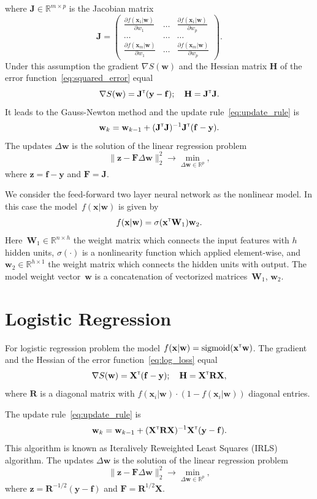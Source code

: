 \documentclass[a4paper,12pt]{article}
\theoremstyle{plain} %
\theoremstyle{definition} %
\theoremstyle{remark} %
\newcommand{\bw}{\mathbf{w}}
\newcommand{\by}{\mathbf{y}}
\newcommand{\bx}{\mathbf{x}}
\newcommand{\bz}{\mathbf{z}}
\newcommand{\bJ}{\mathbf{J}}
\newcommand{\bbR}{\mathbb{R}}
\newcommand{\bW}{\mathbf{W}}
\newcommand{\bH}{\mathbf{H}}
\newcommand{\bF}{\mathbf{F}}
\newcommand{\bR}{\mathbf{R}}
\newcommand{\bX}{\mathbf{X}}
\newcommand{\T}{{\text{\tiny\sffamily\upshape\mdseries T}}}
\begin{document}
	where $\mathbf{J} \in \bbR^{m \times p}$ is the Jacobian matrix
	\begin{equation}
		\bJ = 
		\begin{pmatrix}
		\frac{\partial f(\bx_1 | \bw)}{\partial w_1} & \dots & 
		\frac{\partial f(\bx_1 | \bw)}{\partial w_p} \\
		\dots & \dots & \dots \\
		\frac{\partial f(\bx_m | \bw)}{\partial w_1} & \dots & 
		\frac{\partial f(\bx_m | \bw)}{\partial w_p}
		\end{pmatrix}.
	\end{equation}
	Under this assumption the gradient $\nabla S(\bw)$ and the Hessian matrix $\bH$ of the error function~\eqref{eq:squared_error} equal
	\[
		\nabla S(\bw) = \bJ^{\T} (\by - \mathbf{f}); \quad \bH = \bJ^{\T} \bJ.
	\]
	It leads to the Gauss-Newton method and the update rule~\eqref{eq:update_rule} is 
	\[
		\bw_k = \bw_{k - 1} + (\bJ^{\T} \bJ)^{-1}\bJ^{\T}(\mathbf{f} - \by).
	\]
	The updates $\Delta \bw$ is the solution of the linear regression problem
	\begin{equation}
		\| \bz - \bF \Delta \bw \|_2^2 \rightarrow \min_{\Delta \bw \in \bbR^{p}},
		\label{eq:lin_reg_nonlin_reg}
	\end{equation}
	where $\bz = \mathbf{f} - \by$ and $\bF = \bJ$.
	
	We consider the feed-forward two layer neural network as the nonlinear model. In this case the model~$f(\bx | \bw)$ is given by
	\[
	f(\bx | \bw) = \sigma(\bx^{\T} \bW_1) \bw_2.
	\]
	Here~$\bW_1 \in \bbR^{n \times h}$ the weight matrix which connects the input features with $h$ hidden units, $\sigma(\cdot)$ is a nonlinearity function which applied element-wise, and $\bw_2 \in \bbR^{h \times 1}$ the weight matrix which connects the hidden units with output. 
	The model weight vector~$\bw$ is a concatenation of vectorized matrices~$\bW_1$, $\bw_2$.
	
	\section*{Logistic Regression}
	For logistic regression problem the model $f(\bx | \bw) = \text{sigmoid}(\bx^{\T} \bw)$.
	The gradient and the Hessian of the error function~\eqref{eq:log_loss} equal
	\[
		\nabla S(\bw) = \bX^{\T} (\mathbf{f} - \by); \quad \bH = \bX^{\T} \bR \bX,
	\]
	where $\bR$ is a diagonal matrix with $f(\bx_i | \bw) \cdot (1 - f(\bx_i | \bw))$ diagonal entries.
	
	The update rule~\eqref{eq:update_rule} is
	\[
		\bw_k = \bw_{k - 1} + (\bX^{\T} \bR \bX)^{-1} \bX^{\T} (\by - \mathbf{f}).
	\]
	This algorithm is known as Iteralively Reweighted Least Squares (IRLS) algorithm. The updates $\Delta \bw$ is the solution of the linear regression problem
	\begin{equation}
		\| \bz - \bF \Delta \bw \|_2^2 \rightarrow \min_{\Delta \bw \in \bbR^{p}},
		\label{eq:lin_reg_log_reg}
	\end{equation}
where $\bz = \bR^{-1/2} (\by - \mathbf{f})$ and $\bF = \bR^{1/2}\bX$.
	
\end{document}

